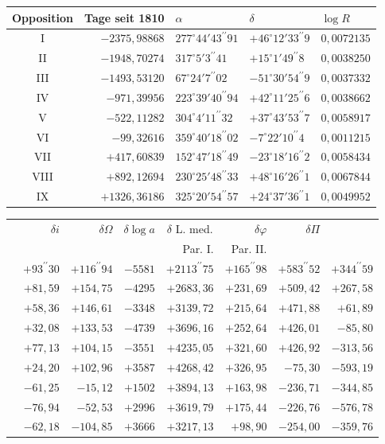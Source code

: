 \documentclass[10pt,a4paper]{article}
\begin{document}
\begin{center}
\begin{tabular}{c|r|l|l|l}
Opposition & Tage seit 1810 & $\alpha$ & $\delta$ & $\log R$ \\
\hline
I & $-2375,98868$ & $277^{\circ}44'43^{\prime\prime}91$ & $+46^{\circ}12'33^{\prime\prime}9$ & $0,0072135$ \\
II & $-1948,70274$ & $317^{\circ} 5' 3^{\prime\prime}41$ & $+15^{\circ} 1'49^{\prime\prime}8$ & $0,0038250$ \\
III & $-1493,53120$ & $67^{\circ}24' 7^{\prime\prime}02$ & $-51^{\circ}30'54^{\prime\prime}9$ & $0,0037332$ \\
IV & $-971,39956$ & $223^{\circ}39'40^{\prime\prime}94$ & $+42^{\circ}11'25^{\prime\prime}6$ & $0,0038662$ \\
V & $-522,11282$ & $304^{\circ} 4'11^{\prime\prime}32$ & $+37^{\circ}43'53^{\prime\prime}7$ & $0,0058917$ \\
VI & $-99,32616$ & $359^{\circ}40'18^{\prime\prime}02$ & $- 7^{\circ}22'10^{\prime\prime}4$ & $0,0011215$ \\
VII & $+417,60839$ & $152^{\circ}47'18^{\prime\prime}49$ & $-23^{\circ}18'16^{\prime\prime}2$ & $0,0058434$ \\
VIII & $+892,12694$ & $230^{\circ}25'48^{\prime\prime}33$ & $+48^{\circ}16'26^{\prime\prime}1$ & $0,0067844$ \\
IX & $+1326,36186$ & $325^{\circ}20'54^{\prime\prime}57$ & $+24^{\circ}37'36^{\prime\prime}1$ & $0,0049952$
\end{tabular}
\end{center}

\begin{center}
\begin{tabular}{r|r|r|r|r|r|r|r}
& $\delta i$ & $\delta \Omega$ & $\delta \log a$ & \multicolumn{1}{c|}{$\delta$ L. med.} & $\delta \varphi$ & $\delta \Pi$ \\
& & & & Par. I. & Par. II. & & \\
\hline
& $+93^{\prime\prime}30$ & $+116^{\prime\prime}94$ & $-5581$ & $+2113^{\prime\prime}75$ & $+165^{\prime\prime}98$ & $+583^{\prime\prime}52$ & $+344^{\prime\prime}59$ \\
& $+81,59$ & $+154,75$ & $-4295$ & $+2683,36$ & $+231,69$ & $+509,42$ & $+267,58$ \\
& $+58,36$ & $+146,61$ & $-3348$ & $+3139,72$ & $+215,64$ & $+471,88$ & $+61,89$ \\
& $+32,08$ & $+133,53$ & $-4739$ & $+3696,16$ & $+252,64$ & $+426,01$ & $-85,80$ \\
& $+77,13$ & $+104,15$ & $-3551$ & $+4235,05$ & $+321,60$ & $+426,92$ & $-313,56$ \\
& $+24,20$ & $+102,96$ & $+3587$ & $+4268,42$ & $+326,95$ & $- 75,30$ & $-593,19$ \\
& $-61,25$ & $-15,12$ & $+1502$ & $+3894,13$ & $+163,98$ & $-236,71$ & $-344,85$ \\
& $-76,94$ & $-52,53$ & $+2996$ & $+3619,79$ & $+175,44$ & $-226,76$ & $-576,78$ \\
& $-62,18$ & $-104,85$ & $+3666$ & $+3217,13$ & $+98,90$ & $-254,00$ & $-359,76$
\end{tabular}
\end{center}
\end{document}
